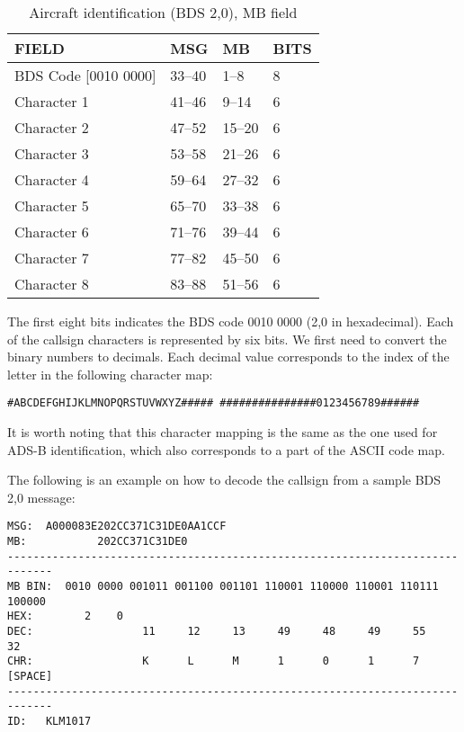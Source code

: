 \begin{table}[ht]
\centering
\caption{Aircraft identification (BDS 2,0), MB field}
\label{tb:bds30}
\begin{tabular}{|l|l|l|l|}
\hline
\textbf{FIELD} & \textbf{MSG} & \textbf{MB} & \textbf{BITS} \\ \hline
BDS Code {[}0010 0000{]} & 33--40 & 1--8 & 8 \\ \hline
Character 1 & 41--46 & 9--14 & 6 \\ \hline
Character 2 & 47--52 & 15--20 & 6 \\ \hline
Character 3 & 53--58 & 21--26 & 6 \\ \hline
Character 4 & 59--64 & 27--32 & 6 \\ \hline
Character 5 & 65--70 & 33--38 & 6 \\ \hline
Character 6 & 71--76 & 39--44 & 6 \\ \hline
Character 7 & 77--82 & 45--50 & 6 \\ \hline
Character 8 & 83--88 & 51--56 & 6 \\ \hline
\end{tabular}
\end{table}


The first eight bits indicates the BDS code 0010 0000 (2,0 in hexadecimal). Each of the callsign characters is represented by six bits. We first need to convert the binary numbers to decimals. Each decimal value corresponds to the index of the letter in the following character map:

\begin{verbatim}
#ABCDEFGHIJKLMNOPQRSTUVWXYZ##### ###############0123456789######
\end{verbatim}

It is worth noting that this character mapping is the same as the one used for ADS-B identification, which also corresponds to a part of the ASCII code map.

The following is an example on how to decode the callsign from a sample BDS 2,0 message:

\begin{verbatim}
MSG:  A000083E202CC371C31DE0AA1CCF
MB:           202CC371C31DE0
-----------------------------------------------------------------------------
MB BIN:  0010 0000 001011 001100 001101 110001 110000 110001 110111 100000
HEX:        2    0
DEC:                 11     12     13     49     48     49     55     32
CHR:                 K      L      M      1      0      1      7     [SPACE]
-----------------------------------------------------------------------------
ID:   KLM1017
\end{verbatim}

